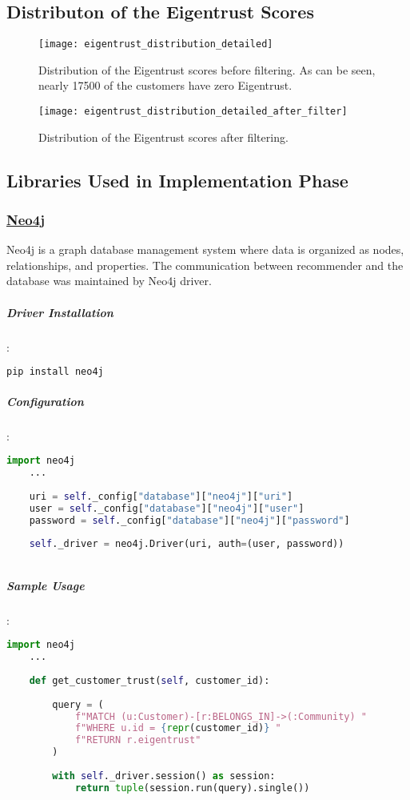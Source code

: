 \subsection{Distributon of the Eigentrust Scores}
	\label{eigentrust_distribution_section}
	\begin{figure}[H]
	\centering
	\texttt{[image: eigentrust\_distribution\_detailed]}
	\caption{Distribution of the Eigentrust scores before filtering. As can be seen, nearly 17500 of the customers have zero Eigentrust.}
	\label{fig:eigentrust_distribution_figure}
	\end{figure}
	\begin{figure}[H]
	\centering
	\texttt{[image: eigentrust\_distribution\_detailed\_after\_filter]}
	\caption{Distribution of the Eigentrust scores after filtering.}
	\label{fig:eigentrust_distribution_figure_after_filtering}
\end{figure}
\subsection{Libraries Used in Implementation Phase}
	\subsubsection{\href{https://neo4j.com/}{Neo4j}}
	Neo4j is a graph database management system where data is organized as nodes, relationships, and properties. The communication between recommender and the database was maintained by Neo4j driver.
	\subparagraph{Driver Installation}:
	\begin{lstlisting}[language=bash]
	pip install neo4j
	\end{lstlisting}
	
	\subparagraph{Configuration}:
	\begin{lstlisting}[language=python]
	import neo4j
	...
	
	uri = self._config["database"]["neo4j"]["uri"]
	user = self._config["database"]["neo4j"]["user"]
	password = self._config["database"]["neo4j"]["password"]
	
	self._driver = neo4j.Driver(uri, auth=(user, password))
	
	\end{lstlisting}
	
	\subparagraph{Sample Usage}:
	\begin{lstlisting}[language=python, caption=Neo4j driver example]
	import neo4j
	...
	
	def get_customer_trust(self, customer_id):
	
		query = (
			f"MATCH (u:Customer)-[r:BELONGS_IN]->(:Community) "
			f"WHERE u.id = {repr(customer_id)} "
			f"RETURN r.eigentrust"
		)
	
		with self._driver.session() as session:
			return tuple(session.run(query).single())
	
	\end{lstlisting}
	

